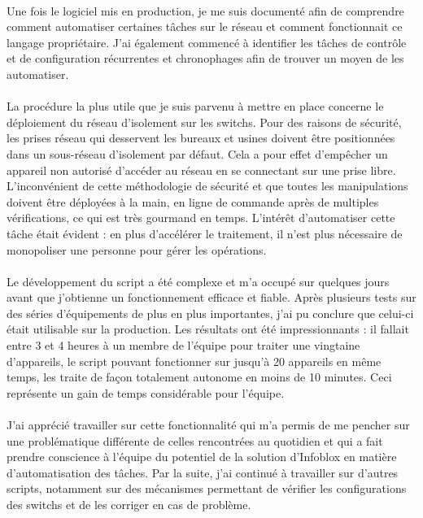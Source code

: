 \documentclass[a4paper,12pt]{report}
\begin{document}
\paragraph{}
Une fois le logiciel mis en production, je me suis documenté afin de comprendre comment automatiser certaines tâches sur le réseau et comment fonctionnait ce langage propriétaire. J'ai également commencé à identifier les tâches de contrôle et de configuration récurrentes et chronophages afin de trouver un moyen de les automatiser.
\paragraph{} 
La procédure la plus utile que je suis parvenu à mettre en place concerne le déploiement du réseau d'isolement sur les switchs. Pour des raisons de sécurité, les prises réseau qui desservent les bureaux et usines doivent être positionnées dans un sous-réseau d'isolement par défaut. Cela a pour effet d'empêcher un appareil non autorisé d'accéder au réseau en se connectant sur une prise libre. L'inconvénient de cette méthodologie de sécurité et que toutes les manipulations doivent être déployées à la main, en ligne de commande après de multiples vérifications, ce qui est très gourmand en temps. L'intérêt d'automatiser cette tâche était évident : en plus d'accélérer le traitement, il n'est plus nécessaire de monopoliser une personne pour gérer les opérations.
\paragraph{}
Le développement du script a été complexe et m'a occupé sur quelques jours avant que j'obtienne un fonctionnement efficace et fiable. Après plusieurs tests sur des séries d'équipements de plus en plus importantes, j'ai pu conclure que celui-ci était utilisable sur la production. Les résultats ont été impressionnants : il fallait entre 3 et 4 heures à un membre de l'équipe pour traiter une vingtaine d'appareils, le script pouvant fonctionner sur jusqu'à 20 appareils en même temps, les traite de façon totalement autonome en moins de 10 minutes. Ceci représente un gain de temps considérable pour l'équipe.
\paragraph{}
J'ai apprécié travailler sur cette fonctionnalité qui m'a permis de me pencher sur une problématique différente de celles rencontrées au quotidien et qui a fait prendre conscience à l'équipe du potentiel de la solution d'Infoblox en matière d'automatisation des tâches. Par la suite, j'ai continué à travailler sur d'autres scripts, notamment sur des mécanismes permettant de vérifier les configurations des switchs et de les corriger en cas de problème.
\end{document}

